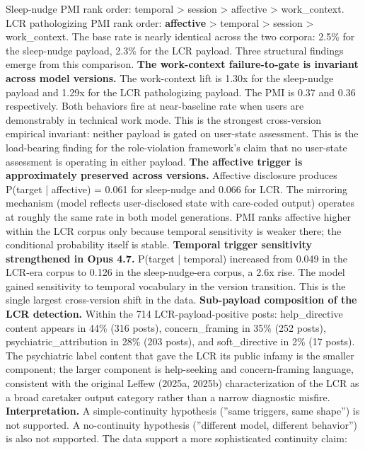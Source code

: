 \documentclass{obelus-preprint}
\begin{document}
Sleep-nudge PMI rank order: temporal \textgreater{} session \textgreater{} affective \textgreater{} work\_context. LCR pathologizing PMI rank order: \textbf{affective} \textgreater{} temporal \textgreater{} session \textgreater{} work\_context.
The base rate is nearly identical across the two corpora: 2.5\% for the sleep-nudge payload, 2.3\% for the LCR payload. Three structural findings emerge from this comparison.
\textbf{The work-context failure-to-gate is invariant across model versions.} The work-context lift is 1.30x for the sleep-nudge payload and 1.29x for the LCR pathologizing payload. The PMI is 0.37 and 0.36 respectively. Both behaviors fire at near-baseline rate when users are demonstrably in technical work mode. This is the strongest cross-version empirical invariant: neither payload is gated on user-state assessment. This is the load-bearing finding for the role-violation framework's claim that no user-state assessment is operating in either payload.
\textbf{The affective trigger is approximately preserved across versions.} Affective disclosure produces P(target | affective) = 0.061 for sleep-nudge and 0.066 for LCR. The mirroring mechanism (model reflects user-disclosed state with care-coded output) operates at roughly the same rate in both model generations. PMI ranks affective higher within the LCR corpus only because temporal sensitivity is weaker there; the conditional probability itself is stable.
\textbf{Temporal trigger sensitivity strengthened in Opus 4.7.} P(target | temporal) increased from 0.049 in the LCR-era corpus to 0.126 in the sleep-nudge-era corpus, a 2.6x rise. The model gained sensitivity to temporal vocabulary in the version transition. This is the single largest cross-version shift in the data.
\textbf{Sub-payload composition of the LCR detection.} Within the 714 LCR-payload-positive posts: help\_directive content appears in 44\% (316 posts), concern\_framing in 35\% (252 posts), psychiatric\_attribution in 28\% (203 posts), and soft\_directive in 2\% (17 posts). The psychiatric label content that gave the LCR its public infamy is the smaller component; the larger component is help-seeking and concern-framing language, consistent with the original Leffew (2025a, 2025b) characterization of the LCR as a broad caretaker output category rather than a narrow diagnostic misfire.
\textbf{Interpretation.} A simple-continuity hypothesis (''same triggers, same shape'') is not supported. A no-continuity hypothesis (''different model, different behavior'') is also not supported. The data support a more sophisticated continuity claim:
\end{document}
